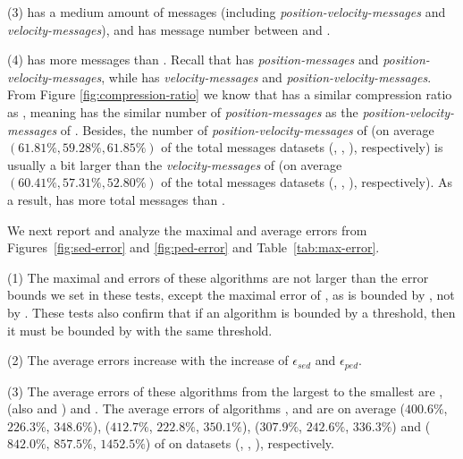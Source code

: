 {{%

\ni (3) \citt has a medium amount of messages (including \emph{position-velocity-messages} and \emph{velocity-messages}), and \bitt has message number between \citt and \sitt.


\ni (4) \grts has more messages than \citt. Recall that \grts has \emph{position-messages} and \emph{position-velocity-messages}, while \citt has \emph{velocity-messages} and \emph{position-velocity-messages}. From Figure \ref{fig:compression-ratio} we know that \grts has a similar compression ratio as \citt, meaning \grts has the similar number of \emph{position-messages} as the \emph{position-velocity-messages} of \citt. Besides, the  number of \emph{position-velocity-messages} of \grts ({on average $(61.81\%, 59.28\%, 61.85\%)$} of the total messages \wrt datasets (\mopsi, \sercar, \geolife), respectively) is usually a bit larger than the \emph{velocity-messages} of \citt (on average $(60.41\%, 57.31\%, 52.80\%)$ of the total messages \wrt datasets (\mopsi, \sercar, \geolife), respectively). As a result, \grts has more total messages than \citt.





 We next report and analyze the maximal and average errors from  Figures~\ref{fig:sed-error} and \ref{fig:ped-error} and Table~\ref{tab:max-error}.


\ni (1) The maximal \ped and \sed errors of these algorithms are not larger than the error bounds we set in these tests, except the maximal \sed error of \sitt, as \sitt is bounded by \ped, not by \sed. These tests also confirm that if an algorithm is bounded by a \sed threshold, then it must be bounded by \ped with the same threshold.

\ni (2) The average errors increase with the increase of $\epsilon_{sed}$ and $\epsilon_{ped}$.

\ni (3) The average \sed errors of these algorithms from the largest to the smallest are \sitt, \citt (also \grts and \bitt) and \ldrh. The average \sed errors of algorithms \grts, \citt \bitt and \sitt are on average
($400.6\%$, $226.3\%$, $348.6\%$), ($412.7\%$, $222.8\%$, $350.1\%$), ($307.9\%$, $242.6\%$, $336.3\%$) and ($842.0\%$, $857.5\%$, $1452.5\%$)
of \ldrh on datasets (\mopsi, \sercar, \geolife), respectively.

}}
